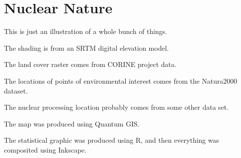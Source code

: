 
\section{Nuclear Nature}

This is just an illustration of a whole bunch of things.

The shading is from an SRTM digital elevation model.

The land cover raster comes from CORINE project data.

The locations of points of environmental interest comes from the Natura2000 dataset.

The nuclear processing location probably comes from some other data set.

The map was produced using Quantum GIS.

The statistical graphic was produced using R, and then everything was 
composited using Inkscape.

